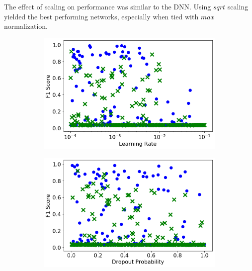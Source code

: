 The effect of scaling on performance was similar to the DNN. Using $sqrt$ scaling yielded the best performing networks, especially when tied with $max$ normalization.


\begin{figure}[H]
     \centering
     \begin{subfigure}[b]{0.49\textwidth}
         \centering
         \includegraphics[width=\textwidth]{images/cnn_learning_rate.png}
         \caption{}
         \label{fig:cnn_learning_rate}
     \end{subfigure}
     \hfill
     \begin{subfigure}[b]{0.49\textwidth}
         \centering
         \includegraphics[width=\textwidth]{images/cnn_dropout.png}
         \caption{}
         \label{fig:cnn_dropout}
     \end{subfigure}


\end{figure}
